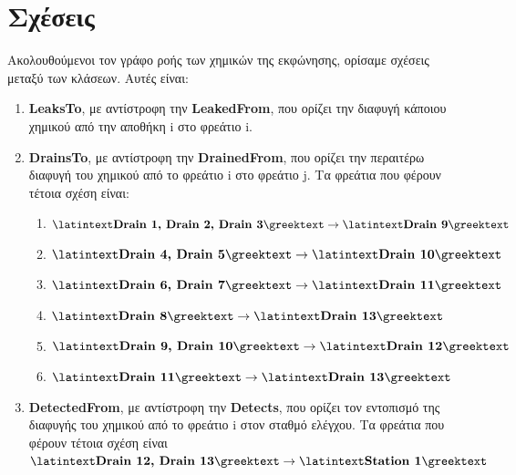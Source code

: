 \documentclass{article}
\newcommand{\lt}[1]{\latintext #1\greektext}
\newcommand{\blt}[1]{\lt{\textbf{#1}}}
\begin{document}
\newpage

\section*{Σχέσεις}
Ακολουθούμενοι τον γράφο ροής των χημικών της εκφώνησης, ορίσαμε σχέσεις μεταξύ των κλάσεων. Αυτές είναι:

\begin{enumerate}
    \item \blt{LeaksTo}, με αντίστροφη την \blt{LeakedFrom}, που ορίζει την διαφυγή κάποιου χημικού από την αποθήκη \lt{i} στο φρεάτιο \lt{i}.
    \item \blt{DrainsTo}, με αντίστροφη την \blt{DrainedFrom}, που ορίζει την περαιτέρω διαφυγή του χημικού από το φρεάτιο \lt{i} στο φρεάτιο \lt{j}. Τα φρεάτια που φέρουν τέτοια σχέση είναι:
    \begin{enumerate}
        \item $\blt{Drain 1, Drain 2, Drain 3} \rightarrow \blt{Drain 9}$
        \item $\blt{Drain 4, Drain 5} \rightarrow \blt{Drain 10}$
        \item $\blt{Drain 6, Drain 7} \rightarrow \blt{Drain 11}$
        \item $\blt{Drain 8} \rightarrow \blt{Drain 13}$
        \item $\blt{Drain 9, Drain 10} \rightarrow \blt{Drain 12}$
        \item $\blt{Drain 11} \rightarrow \blt{Drain 13}$
    \end{enumerate}
    \item \blt{DetectedFrom}, με αντίστροφη την \blt{Detects}, που ορίζει τον εντοπισμό της διαφυγής του χημικού από το φρεάτιο \lt{i} στον σταθμό ελέγχου. Τα φρεάτια που φέρουν τέτοια σχέση είναι $\blt{Drain 12, Drain 13} \rightarrow \blt{Station 1}$
\end{enumerate}
\end{document}
